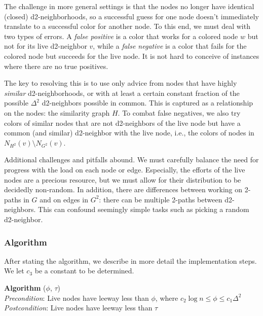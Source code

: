 The challenge in more general settings is that the nodes no longer have identical (closed) d2-neighborhoods, so a successful guess for one node doesn't immediately translate to a successful color for another node.
To this end, we must deal with two types of errors.
A \emph{false positive} is a color that works for a colored node $w$ but not for its live d2-neighbor $v$, while a \emph{false negative} is a color that fails for the colored node but succeeds for the live node.
It is not hard to conceive of instances where there are no true positives.

The key to resolving this is to use only advice from nodes that have highly \emph{similar} d2-neighborhoods, or with at least a certain constant fraction of the possible $\Delta^2$ d2-neighbors possible in common. This is captured as a relationship on the nodes: the similarity graph $H$.
To combat false negatives, we also try colors of similar nodes that are not d2-neighbors of the live node but have a common (and similar) d2-neighbor with the live node, i.e., the colors of nodes in $N_{H^2}(v) \setminus N_{G^2}(v)$.

Additional challenges and pitfalls abound. We must carefully balance the need for progress with the load on each node or edge. Especially, the efforts of the live nodes are a precious resource, %
but we must allow for their distribution to be decidedly non-random.  
In addition, there are differences between working on 2-paths in $G$ and on edges in $G^2$: there can be multiple 2-paths between d2-neighbors. This can confound seemingly simple tasks such as picking a random d2-neighbor.

\subsubsection{Algorithm }
After stating the algorithm, we describe in more detail the implementation steps.
We let $c_3$ be a constant to be determined. 
\medskip

   \textbf{Algorithm} ($\phi$, $\tau$) \\
    \emph{Precondition}: Live nodes have leeway less than $\phi$, where $c_2\log n \le \phi \le c_1\Delta^2$ \\
    \emph{Postcondition}: Live nodes have leeway less than $\tau$


